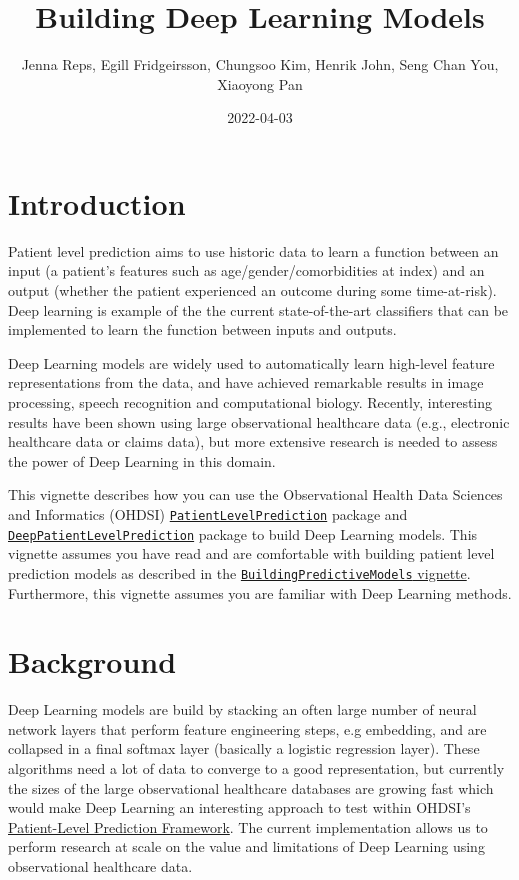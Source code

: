 \documentclass[
]{article}
\title{Building Deep Learning Models}
\author{Jenna Reps, Egill Fridgeirsson, Chungsoo Kim, Henrik John, Seng
Chan You, Xiaoyong Pan}
\date{2022-04-03}
\begin{document}
\maketitle

{
\setcounter{tocdepth}{3}
\tableofcontents
}
\hypertarget{introduction}{%
\section{Introduction}\label{introduction}}

Patient level prediction aims to use historic data to learn a function
between an input (a patient's features such as age/gender/comorbidities
at index) and an output (whether the patient experienced an outcome
during some time-at-risk). Deep learning is example of the the current
state-of-the-art classifiers that can be implemented to learn the
function between inputs and outputs.

Deep Learning models are widely used to automatically learn high-level
feature representations from the data, and have achieved remarkable
results in image processing, speech recognition and computational
biology. Recently, interesting results have been shown using large
observational healthcare data (e.g., electronic healthcare data or
claims data), but more extensive research is needed to assess the power
of Deep Learning in this domain.

This vignette describes how you can use the Observational Health Data
Sciences and Informatics (OHDSI)
\href{http://github.com/OHDSI/PatientLevelPrediction}{\texttt{PatientLevelPrediction}}
package and
\href{http://github.com/OHDSI/DeepPatientLevelPrediction}{\texttt{DeepPatientLevelPrediction}}
package to build Deep Learning models. This vignette assumes you have
read and are comfortable with building patient level prediction models
as described in the
\href{https://github.com/OHDSI/PatientLevelPrediction/blob/main/inst/doc/BuildingPredictiveModels.pdf}{\texttt{BuildingPredictiveModels}
vignette}. Furthermore, this vignette assumes you are familiar with Deep
Learning methods.

\hypertarget{background}{%
\section{Background}\label{background}}

Deep Learning models are build by stacking an often large number of
neural network layers that perform feature engineering steps, e.g
embedding, and are collapsed in a final softmax layer (basically a
logistic regression layer). These algorithms need a lot of data to
converge to a good representation, but currently the sizes of the large
observational healthcare databases are growing fast which would make
Deep Learning an interesting approach to test within OHDSI's
\href{https://academic.oup.com/jamia/article/25/8/969/4989437}{Patient-Level
Prediction Framework}. The current implementation allows us to perform
research at scale on the value and limitations of Deep Learning using
observational healthcare data.
\end{document}
